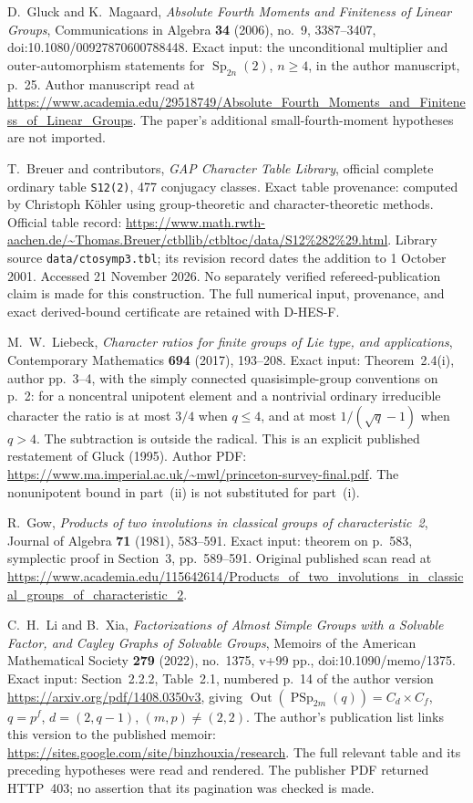 D.~Gluck and K.~Magaard,
\emph{Absolute Fourth Moments and Finiteness of Linear Groups},
Communications in Algebra \textbf{34} (2006), no.~9, 3387--3407,
doi:10.1080/00927870600788448.
Exact input: the unconditional multiplier and outer-automorphism statements
for $\operatorname{Sp}_{2n}(2)$, $n\ge4$, in the author manuscript, p.~25.
Author manuscript read at
\url{https://www.academia.edu/29518749/Absolute_Fourth_Moments_and_Finiteness_of_Linear_Groups}.
The paper's additional small-fourth-moment hypotheses are not imported.

T.~Breuer and contributors, \emph{GAP Character Table Library},
official complete ordinary table \texttt{S12(2)}, 477 conjugacy classes.
Exact table provenance: computed by Christoph K\"ohler using
group-theoretic and character-theoretic methods.
Official table record:
\url{https://www.math.rwth-aachen.de/~Thomas.Breuer/ctbllib/ctbltoc/data/S12\%282\%29.html}.
Library source \texttt{data/ctosymp3.tbl}; its revision record dates the
addition to 1 October 2001. Accessed 21 November 2026.
No separately verified refereed-publication claim is made for this
construction. The full numerical input, provenance, and exact derived-bound
certificate are retained with D-HES-F.

M.~W.~Liebeck,
\emph{Character ratios for finite groups of Lie type, and applications},
Contemporary Mathematics \textbf{694} (2017), 193--208.
Exact input: Theorem~2.4(i), author pp.~3--4, with the simply connected
quasisimple-group conventions on p.~2: for a noncentral unipotent element
and a nontrivial ordinary irreducible character the ratio is at most $3/4$
when $q\le4$, and at most $1/(\sqrt q-1)$ when $q>4$.
The subtraction is outside the radical. This is an explicit published
restatement of Gluck (1995).
Author PDF: \url{https://www.ma.imperial.ac.uk/~mwl/princeton-survey-final.pdf}.
The nonunipotent bound in part~(ii) is not substituted for part~(i).

R.~Gow,
\emph{Products of two involutions in classical groups of characteristic~2},
Journal of Algebra \textbf{71} (1981), 583--591.
Exact input: theorem on p.~583, symplectic proof in Section~3, pp.~589--591.
Original published scan read at
\url{https://www.academia.edu/115642614/Products_of_two_involutions_in_classical_groups_of_characteristic_2}.

C.~H.~Li and B.~Xia,
\emph{Factorizations of Almost Simple Groups with a Solvable Factor,
and Cayley Graphs of Solvable Groups},
Memoirs of the American Mathematical Society \textbf{279} (2022),
no.~1375, v+99 pp., doi:10.1090/memo/1375.
Exact input: Section~2.2.2, Table~2.1, numbered p.~14 of the author
version \url{https://arxiv.org/pdf/1408.0350v3}, giving
$\operatorname{Out}(\operatorname{PSp}_{2m}(q))=C_d\times C_f$,
$q=p^f$, $d=(2,q-1)$, $(m,p)\ne(2,2)$.
The author's publication list links this version to the published memoir:
\url{https://sites.google.com/site/binzhouxia/research}.
The full relevant table and its preceding hypotheses were read and
rendered. The publisher PDF returned HTTP~403; no assertion that its
pagination was checked is made.
